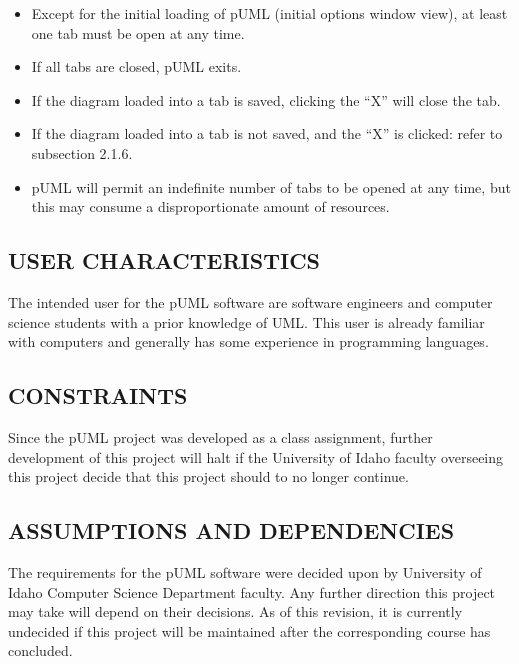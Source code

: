 \documentclass[twoside,letterpaper]{article}
\begin{document}
{\begin{itemize}
\item Except for the initial loading of pUML (initial options window view), at least one tab must be open at any time.
\item If all tabs are closed, pUML exits.
\item If the diagram loaded into a tab is saved, clicking the ``X'' will close the tab.
\item If the diagram loaded into a tab is not saved, and the ``X'' is clicked: refer to subsection 2.1.6.
\item pUML will permit an indefinite number of tabs to be opened at any time, but this may consume a disproportionate amount of resources.
\end{itemize}



\bigskip




}

\subsection[USER CHARACTERISTICS]{\bfseries
USER CHARACTERISTICS}
{
The intended user for the pUML software are software engineers and computer science students with a prior knowledge of UML. This user is already familiar with computers and generally has some experience in programming languages.
}

\subsection[CONSTRAINTS]{\bfseries
CONSTRAINTS}
{
Since the pUML project was developed as a class assignment,
further development of this project will halt if the University of Idaho faculty overseeing this project decide that this project should to no longer continue.
}

\subsection[ASSUMPTIONS AND DEPENDENCIES]{\bfseries
ASSUMPTIONS AND DEPENDENCIES}
{
The requirements for the pUML software were decided upon by University of Idaho Computer Science Department faculty.  Any further direction this project may take will depend on their decisions. As of this revision, it is currently undecided if this project will be maintained after the corresponding course has concluded. 
}
\end{document}
